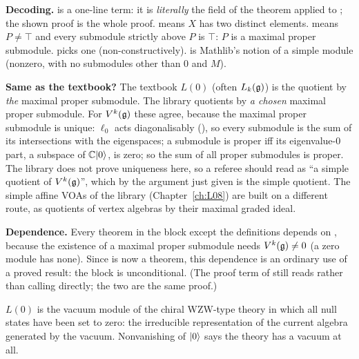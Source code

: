 \begin{dictionary}
\textbf{Decoding.} \allowbreak{} is a one-line term: it is \emph{literally} the field
 of the theorem  applied to ; the shown proof is the whole
proof.
 means $X$ has two distinct elements.  means $P\ne\top$ and every
submodule strictly above $P$ is $\top$: $P$ is a maximal proper submodule.  picks one
(non-constructively).  is Mathlib's notion of a simple module (nonzero, with no
submodules other than $0$ and $M$).

\textbf{Same as the textbook?} The textbook $L(0)$ (often $L_k(\mathfrak{g})$) is the quotient by \emph{the}
maximal proper submodule. The library quotients by \emph{a chosen} maximal proper submodule. For
$V^k(\mathfrak{g})$ these agree, because the maximal proper submodule is unique: $\ell_0$ acts diagonalisably
(), so every submodule is the sum of its intersections with the eigenspaces; a
submodule is proper iff its eigenvalue-$0$ part, a subspace of ${\mathbb{C}}|0\rangle$, is zero; so the sum of all
proper submodules is proper. The library does not prove uniqueness here, so a referee should read
 as ``a simple quotient of $V^k(\mathfrak{g})$'', which by the argument just given is the
simple quotient. The simple affine VOAs of the library (Chapter~\ref{ch:L08}) are built on a different
route, as quotients of vertex algebras by their maximal graded ideal.

\textbf{Dependence.} Every theorem in the block except the definitions depends on ,
because the existence of a maximal proper submodule needs $V^k(\mathfrak{g})\ne0$ (a zero module has none).
Since  is now a theorem, this dependence is an ordinary use of a proved result: the block is
unconditional. (The proof term of \allowbreak{} still reads
 rather than calling
\allowbreak{}\allowbreak{}\allowbreak{}\allowbreak{} directly; the two are the same proof.)
\end{dictionary}

\begin{physics}
$L(0)$ is the vacuum module of the chiral WZW-type theory in which all null states have been set to
zero: the irreducible representation of the current algebra generated by the vacuum. Nonvanishing of
$|0\rangle$ says the theory has a vacuum at all.
\end{physics}

